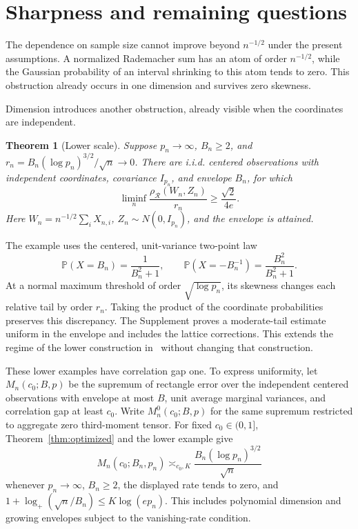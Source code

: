 \documentclass[11pt,letterpaper]{article}
\newtheorem{theorem}{Theorem}
\theoremstyle{remark}
\newcommand{\Pp}{\mathbb P}
\newcommand{\rh}{\rho_{\mathcal R}}
\begin{document}
\section{Sharpness and remaining questions}\label{opt:section}
The dependence on sample size cannot improve beyond \(n^{-1/2}\)
under the present assumptions. A normalized Rademacher sum has an atom
of order \(n^{-1/2}\), while the Gaussian probability of an interval
shrinking to this atom tends to zero. This obstruction already occurs
in one dimension and survives zero skewness.

Dimension introduces another obstruction, already visible when the
coordinates are independent.
\begin{theorem}[Lower scale]\label{opt:skew-lower}
Suppose \(p_n\to\infty\), \(B_n\ge2\), and
\(r_n=B_n(\log p_n)^{3/2}/\sqrt n\to0\). There are i.i.d.
centered observations with independent coordinates, covariance
\(I_{p_n}\), and envelope \(B_n\), for which
\begin{equation}
 \liminf_n\frac{\rh(W_n,Z_n)}{r_n}\ge\frac{\sqrt2}{4e}.
 \label{opt:lower-constant}
\end{equation}
Here \(W_n=n^{-1/2}\sum_iX_{n,i}\),
\(Z_n\sim N(0,I_{p_n})\), and the envelope is attained.
\end{theorem}
The example uses the centered, unit-variance two-point law
\[
 \Pp(X=B_n)=\frac1{B_n^2+1},\qquad
 \Pp(X=-B_n^{-1})=\frac{B_n^2}{B_n^2+1}.
\]
At a normal maximum threshold of order \(\sqrt{\log p_n}\), its
skewness changes each relative tail by order \(r_n\). Taking the
product of the coordinate probabilities preserves this discrepancy.
The Supplement proves a moderate-tail estimate uniform in the envelope
and includes the lattice corrections. This extends the regime of the
lower construction in~\cite{CCK} without changing that construction.

These lower examples have correlation gap one. To express uniformity,
let \(M_n(c_0;B,p)\) be the supremum of rectangle error over the
independent centered observations with envelope at most \(B\), unit
average marginal variances, and correlation gap at least \(c_0\).
Write \(M_n^0(c_0;B,p)\) for the same supremum restricted to
aggregate zero third-moment tensor.
For fixed \(c_0\in(0,1]\), Theorem~\ref{thm:optimized} and the lower
example give
\begin{equation}
 M_n(c_0;B_n,p_n)\asymp_{c_0,K}
 \frac{B_n(\log p_n)^{3/2}}{\sqrt n}
 \label{opt:matching-minimax}
\end{equation}
whenever \(p_n\to\infty\), \(B_n\ge2\), the displayed rate tends
to zero, and \(1+\log_+(\sqrt n/B_n)\le K\log(ep_n)\).
This includes polynomial dimension and growing envelopes subject to
the vanishing-rate condition.
\end{document}
